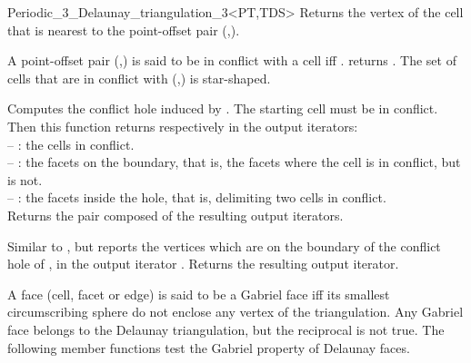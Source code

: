 \begin{ccRefClass}{Periodic_3_Delaunay_triangulation_3<PT,TDS>}
{Returns the  vertex  of the cell  that is nearest to the
  point-offset pair (,).
}

A point-offset pair (,) is said to be in conflict with
a cell  iff \ccVar. returns
. 
The set of cells that are in conflict with (,) is
star-shaped.

{Computes the  conflict hole induced by .  The starting cell
 must be in conflict.  Then this function returns
respectively in the output iterators:\\
-- : the cells in conflict.\\
-- : the facets on the boundary, that is, the facets
 where the cell  is in
conflict, but  is not.\\
-- : the facets inside the hole, that is, delimiting two
cells in conflict.\\
Returns the pair composed of the resulting output iterators.
}

{Similar to , but reports the vertices which are on the
boundary of the conflict hole of , in the output iterator .
Returns the resulting output iterator.
}

A face (cell, facet or edge) is said to be a Gabriel face iff
its smallest circumscribing sphere do not enclose
any vertex of the triangulation.  Any Gabriel face belongs to the
Delaunay triangulation, but the reciprocal is not true.
The following member functions test the Gabriel property of
Delaunay faces.
\ccGlue 
{}
\ccGlue 
{}
\ccGlue
{} {}



\end{ccRefClass}
